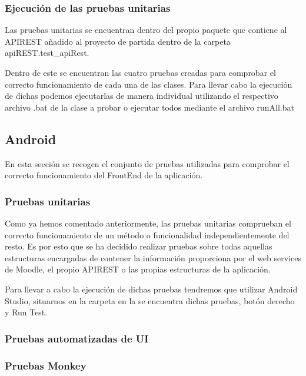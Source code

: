 \subsubsection{Ejecución de las pruebas unitarias}

Las pruebas unitarias se encuentran dentro del propio paquete que contiene al APIREST añadido al proyecto de partida dentro de la carpeta apiREST.test\_apiRest. 


Dentro de este se encuentran las cuatro pruebas creadas para comprobar el correcto funcionamiento de cada una de las clases. Para llevar cabo la ejecución de dichas podemos ejecutarlas de manera individual utilizando el respectivo archivo .bat de la clase a probar o ejecutar todos mediante el archivo runAll.bat

\subsection{Android}

En esta sección se recogen el conjunto de pruebas utilizadas para comprobar el correcto funcionamiento del FrontEnd de la aplicación.

\subsubsection{Pruebas unitarias}

Como ya hemos comentado anteriormente, las pruebas unitarias comprueban el correcto funcionamiento de un método o funcionalidad independientemente del resto. Es por esto que se ha decidido realizar pruebas sobre todas aquellas estructuras encargadas de contener la información proporciona por el web services de Moodle, el propio APIREST o las propias estructuras de la aplicación.


Para llevar a cabo la ejecución de dichas pruebas tendremos que utilizar Android Studio, situarnos en la carpeta en la se encuentra dichas pruebas, botón derecho y Run Test.






\subsubsection{Pruebas automatizadas de UI}

\subsubsection{Pruebas Monkey}